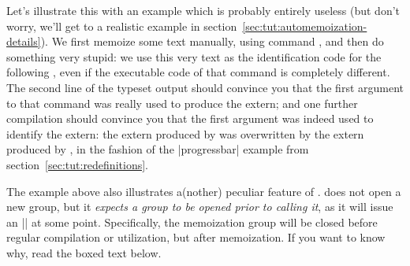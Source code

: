 \documentclass[a4paper,11pt]{article}
\begin{document}
Let's illustrate this with an example which is probably entirely useless (but
don't worry, we'll get to a realistic example in
section~\ref{sec:tut:automemoization-details}).  We first memoize some text
manually, using command , and then do something very stupid: we use
this very text as the identification code for the following ,
even if the executable code of that command is completely different.  The
second line of the typeset output should convince you that the first argument
to that command was really used to produce the extern; and one further
compilation should convince you that the first argument was indeed used to
identify the extern: the extern produced by  was overwritten by the
extern produced by , in the fashion of the |progressbar|
example from section~\ref{sec:tut:redefinitions}.


The example above also illustrates a(nother) peculiar feature of
.   does not open a new  group, but
it \emph{expects a group to be opened prior to calling it}, as it will issue an
|\endgroup| at some point.  Specifically, the memoization group will be closed
before regular compilation or utilization, but after memoization.  If you want
to know why, read the boxed text below.
\end{document}
